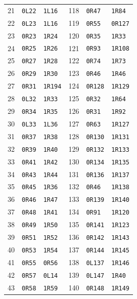 \begin{longtable}{@{}rll@{\hspace{24pt}}rll@{}}
21 & \texttt{0L22} & \texttt{1L16} & 118 & \texttt{0R47} & \texttt{1R84}\\
22 & \texttt{0L23} & \texttt{1L16} & 119 & \texttt{0R55} & \texttt{0R127}\\
23 & \texttt{0R23} & \texttt{1R24} & 120 & \texttt{0R35} & \texttt{1R33}\\
24 & \texttt{0R25} & \texttt{1R26} & 121 & \texttt{0R93} & \texttt{1R108}\\
25 & \texttt{0R27} & \texttt{1R28} & 122 & \texttt{0R74} & \texttt{1R73}\\
26 & \texttt{0R29} & \texttt{1R30} & 123 & \texttt{0R46} & \texttt{1R46}\\
27 & \texttt{0R31} & \texttt{1R194} & 124 & \texttt{0R128} & \texttt{1R129}\\
28 & \texttt{0L32} & \texttt{1R33} & 125 & \texttt{0R32} & \texttt{1R64}\\
29 & \texttt{0R34} & \texttt{1R35} & 126 & \texttt{0R31} & \texttt{1R92}\\
30 & \texttt{0L33} & \texttt{1L36} & 127 & \texttt{0R63} & \texttt{1R127}\\
31 & \texttt{0R37} & \texttt{1R38} & 128 & \texttt{0R130} & \texttt{1R131}\\
32 & \texttt{0R39} & \texttt{1R40} & 129 & \texttt{0R132} & \texttt{1R133}\\
33 & \texttt{0R41} & \texttt{1R42} & 130 & \texttt{0R134} & \texttt{1R135}\\
34 & \texttt{0R43} & \texttt{1R44} & 131 & \texttt{0R136} & \texttt{1R137}\\
35 & \texttt{0R45} & \texttt{1R36} & 132 & \texttt{0R46} & \texttt{1R138}\\
36 & \texttt{0R46} & \texttt{1R47} & 133 & \texttt{0R139} & \texttt{1R140}\\
37 & \texttt{0R48} & \texttt{1R41} & 134 & \texttt{0R91} & \texttt{1R120}\\
38 & \texttt{0R49} & \texttt{1R50} & 135 & \texttt{0R141} & \texttt{1R123}\\
39 & \texttt{0R51} & \texttt{1R52} & 136 & \texttt{0R142} & \texttt{1R143}\\
40 & \texttt{0R53} & \texttt{1R54} & 137 & \texttt{0R144} & \texttt{1R145}\\
41 & \texttt{0R55} & \texttt{0R56} & 138 & \texttt{0L137} & \texttt{1R146}\\
42 & \texttt{0R57} & \texttt{0L14} & 139 & \texttt{0L147} & \texttt{1R40}\\
43 & \texttt{0R58} & \texttt{1R59} & 140 & \texttt{0R148} & \texttt{1R149}\\

\end{longtable}
